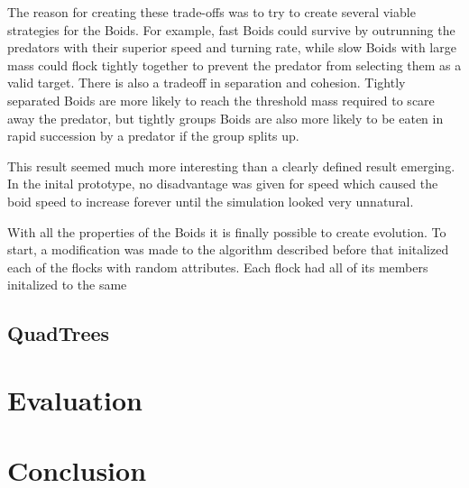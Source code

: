 \documentclass{egpubl}
\begin{document}
The reason for creating these trade-offs was to try to create several viable strategies for the Boids. For example, fast Boids could survive by outrunning the predators with their superior speed and turning rate, while slow Boids with large mass could flock tightly together to prevent the predator from selecting them as a valid target. There is also a tradeoff in separation and cohesion. Tightly separated Boids are more likely to reach the threshold mass required to scare away the predator, but tightly groups Boids are also more likely to be eaten in rapid succession by a predator if the group splits up.
\par
This result seemed much more interesting than a clearly defined result emerging. In the inital prototype, no disadvantage was given for speed which caused the boid speed to increase forever until the simulation looked very unnatural. 
\par
With all the properties of the Boids it is finally possible to create evolution. To start, a modification was made to the algorithm described before that initalized each of the flocks with random attributes. Each flock had all of its members initalized to the same
\subsection{QuadTrees}
\label{qtree}
\section{Evaluation}
\section{Conclusion}
\printbibliography                
\end{document}
